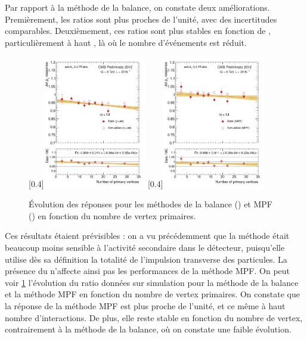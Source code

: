Par rapport à la méthode de la balance, on constate deux améliorations. Premièrement, les ratios sont plus proches de l'unité, avec des incertitudes comparables. Deuxièmement, ces ratios sont plus stables en fonction de \aeta, particulièrement à haut \aeta, là où le nombre d'événements est réduit.

\begin{figure}[p!]
    \centering
    \subcaptionbox{\label{fig:npv_bal_eta013}}[0.4\textwidth]{\includegraphics[width=0.4\textwidth]{chapitre4/figs/resp_vs_npv/resp_balancing_eta013_vs_npv_FITLINE.pdf}}\qquad
    \subcaptionbox{\label{fig:npv_mpf_eta013}}[0.4\textwidth]{\includegraphics[width=0.4\textwidth]{chapitre4/figs/resp_vs_npv/resp_mpf_eta013_vs_npv_FITLINE.pdf}}
    \caption{Évolution des réponses pour les méthodes de la balance () et MPF () en fonction du nombre de vertex primaires.}
    \label{fig:resp_vs_npv}
\end{figure}

Ces résultats étaient prévisibles : on a vu précédemment que la méthode était beaucoup moins sensible à l'activité secondaire dans le détecteur, puisqu'elle utilise dès sa définition la totalité de l'impulsion transverse des particules. La présence du \pu n'affecte ainsi pas les performances de la méthode MPF. On peut voir \cref{fig:resp_vs_npv} l'évolution du ratio données sur simulation pour la méthode de la balance et la méthode MPF en fonction du nombre de vertex primaires. On constate que la réponse de la méthode MPF est plus proche de l'unité, et ce même à haut nombre d'interactions. De plus, elle reste stable en fonction du nombre de vertex, contrairement à la méthode de la balance, où on constate une faible évolution.

